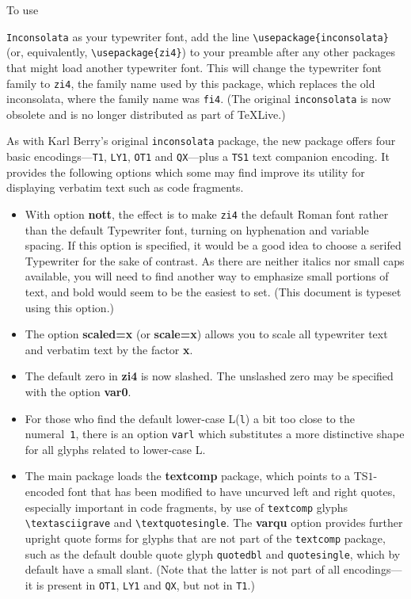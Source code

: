 \documentclass[11pt]{article}
\begin{document}
To use {\texttt{Inconsolata} as your typewriter font, add the line \verb|\usepackage{inconsolata}| (or, equivalently, \verb|\usepackage{zi4}|) to your preamble after any other packages that might load another typewriter font.  This
will change the typewriter font family to \texttt{zi4}, the family name used
by this package, which replaces the old \textsf{inconsolata}, where the family name was \texttt{fi4}.  (The original {\tt inconsolata} is now obsolete and is no longer distributed as part of \TeX Live.) 

As with Karl Berry's original \texttt{inconsolata} package, the new package offers four basic encodings---\texttt{T1}, \texttt{LY1}, \texttt{OT1} and \texttt{QX}---plus a \texttt{TS1} text companion encoding. It provides the following options which some may find improve its utility for displaying verbatim text such as code fragments. 
\begin{itemize}
\item With option {\bf nott}, the effect is to make {\tt zi4} the default Roman font rather than the default Typewriter font, turning on hyphenation and variable spacing. If this option is specified, it would be a good idea to choose a serifed Typewriter for the sake of contrast. As there are neither italics nor small caps available, you will need to find another way to emphasize small portions of text, and bold would seem to be the easiest to set.
(This document is typeset using this option.)
\item The option \textbf{scaled=x} (or \textbf{scale=x}) allows you to scale all typewriter text and verbatim text by the factor \textbf{x}.
\item
The default zero in \textbf{zi4} is now slashed. The unslashed zero may be specified with the option \textbf{var0}.
\item For those who find the default lower-case L(\texttt{l}) a bit too close to the numeral~\texttt{1}, there is an option \texttt{varl} which substitutes a more distinctive shape for all glyphs related to lower-case L.
\item The main package loads the \textbf{textcomp} package, which points to a TS$1$-encoded font that has been modified to have uncurved left and right quotes, especially important in code fragments, by use of \texttt{textcomp} glyphs \verb|\textasciigrave| and \verb|\textquotesingle|. The \textbf{varqu} option provides further upright quote forms for glyphs that are not part of the \texttt{textcomp} package, such as 
the default double quote glyph \texttt{quotedbl} and \texttt{quotesingle}, which by default have a small slant. (Note that the latter is not part of all encodings---it is present in \texttt{OT1}, \texttt{LY1} and \texttt{QX}, but not in \texttt{T1}.)

\end{itemize}}
\end{document}
